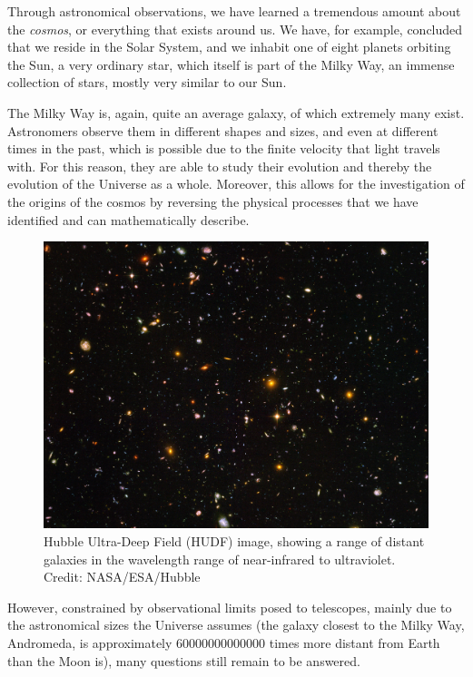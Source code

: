 Through astronomical observations, we have learned a tremendous amount about the \textit{cosmos}, or everything that exists around us. We have, for example, concluded that we reside in the Solar System, and we inhabit one of eight planets orbiting the Sun, a very ordinary star, which itself is part of the Milky Way, an immense collection of stars, mostly very similar to our Sun.

\par The Milky Way is, again, quite an average galaxy, of which extremely many exist. Astronomers observe them in different shapes and sizes, and even at different times in the past, which is possible due to the finite velocity that light travels with. For this reason, they are able to study their evolution and thereby the evolution of the Universe as a whole. Moreover, this allows for the investigation of the origins of the cosmos by reversing the physical processes that we have identified and can mathematically describe.
\begin{figure}[b!]
	\centering
	\includegraphics[width=0.8\linewidth]{"Images/HUDF"}
	\caption[Hubble Ultra-Deep Field]{Hubble Ultra-Deep Field (HUDF) image, showing a range of distant galaxies in the wavelength range of near-infrared to ultraviolet. Credit: NASA/ESA/Hubble}
	\label{fig:HUDF}
\end{figure}

\par However, constrained by observational limits posed to telescopes, mainly due to the astronomical sizes the Universe assumes (the galaxy closest to the Milky Way, Andromeda, is approximately \num{60000000000000} times more distant from Earth than the Moon is), many questions still remain to be answered.

